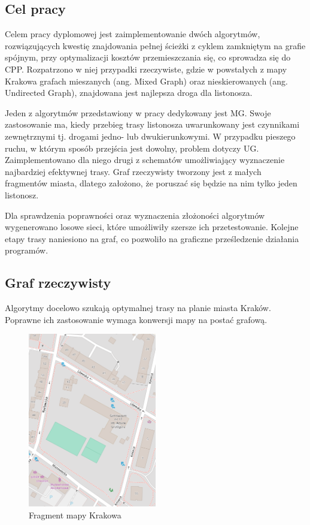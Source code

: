 \documentclass[a4paper, 12pt, twoside, openright]{article}
\begin{document}
\subsection{Cel pracy}
	\indent\par
	Celem pracy dyplomowej jest zaimplementowanie dwóch algorytmów, rozwiązujących kwestię znajdowania pełnej ścieżki z cyklem zamkniętym na grafie spójnym, przy optymalizacji kosztów przemieszczania się, co sprowadza się do CPP. 
	Rozpatrzono w niej przypadki rzeczywiste, gdzie w powstałych z mapy Krakowa grafach mieszanych (ang. Mixed Graph) oraz nieskierowanych (ang. Undirected Graph), znajdowana jest najlepsza droga dla listonosza\cite{mixedGraph}.


	Jeden z algorytmów przedstawiony w pracy dedykowany jest MG. Swoje zastosowanie ma, kiedy przebieg trasy listonosza uwarunkowany jest czynnikami zewnętrznymi tj. drogami jedno- lub dwukierunkowymi. 
	W przypadku pieszego ruchu, w którym sposób przejścia jest  dowolny, problem dotyczy UG. Zaimplementowano dla niego drugi z schematów umożliwiający wyznaczenie najbardziej efektywnej trasy. Graf rzeczywisty tworzony jest z małych fragmentów miasta, dlatego założono, że poruszać się będzie na nim tylko jeden listonosz. 


	Dla sprawdzenia poprawności oraz wyznaczenia złożoności algorytmów wygenerowano losowe sieci, które umożliwiły szersze ich przetestowanie. 
	Kolejne etapy trasy naniesiono na graf, co pozwoliło na graficzne prześledzenie działania programów.


\subsection{Graf rzeczywisty}\label{grafRzecz}
	\indent\par
	Algorytmy docelowo szukają optymalnej trasy na planie miasta Kraków. Poprawne ich zastosowanie wymaga konwersji mapy na postać grafową. 
	
	\begin{figure}[htb]
			\centering
			\includegraphics[width=0.5\textwidth]{OSM1}
			\caption[]{Fragment mapy Krakowa\footnotemark}
			\label{osm1}
	\end{figure}
	
\end{document}
